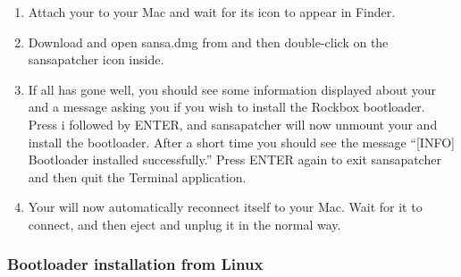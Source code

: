 \begin{enumerate}

\item Attach your \dap{} to your Mac and wait for its icon to appear in 
Finder.

\item Download and open sansa.dmg from 
and then double-click on the sansapatcher icon inside. 

\item If all has gone well, you should see some
information displayed about your \dap{} and a message asking you if you 
wish to install the Rockbox bootloader. Press i followed by ENTER, and 
sansapatcher will now unmount your \dap{} and install the bootloader. 
After a short time you should see the message ``[INFO] Bootloader installed successfully.'' Press ENTER again to exit sansapatcher and then quit the Terminal application.

\item Your \dap{} will now automatically reconnect itself to your Mac. 
Wait for it to connect, and then eject and unplug it in the normal way. 

\end{enumerate}

\subsubsection{Bootloader installation from Linux}

